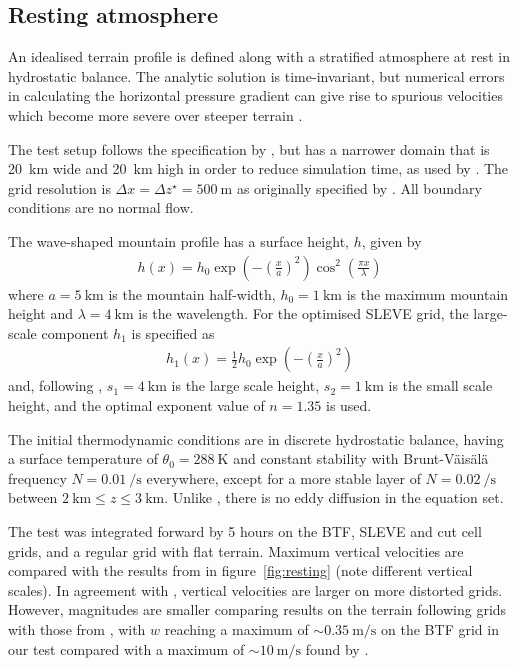 \documentclass[twocol]{ametsoc}
\begin{document}
\subsection{Resting atmosphere}
An idealised terrain profile is defined along with a stratified atmosphere at rest in hydrostatic balance.  The analytic solution is time-invariant, but numerical errors in calculating the horizontal pressure gradient can give rise to spurious velocities which become more severe over steeper terrain \citet{klemp2011}.

The test setup follows the specification by \cite{klemp2011}, but has a narrower domain that is \SI{20}{\kilo\meter} wide and \SI{20}{\kilo\meter} high in order to reduce simulation time, as used by \citet{weller-shahrokhi2014}.  The grid resolution is \(\Delta x = \Delta z^\star = \SI{500}{\meter}\) as originally specified by \citet{klemp2011}.  All boundary conditions are no normal flow.

The wave-shaped mountain profile has a surface height, $h$, given by
\begin{align}
	h(x) = h_0 \exp \left( - \left( \frac{x}{a} \right)^2 \right) \cos^2 \left( \frac{\pi x}{\lambda} \right) \label{eqn:resting:mountain}
\end{align}
where $a = \SI{5}{\kilo\meter}$ is the mountain half-width, $h_0 = \SI{1}{\kilo\meter}$ is the maximum mountain height and $\lambda = \SI{4}{\kilo\meter}$ is the wavelength.  For the optimised SLEVE grid, the large-scale component $h_1$ is specified as
\begin{align}
h_1(x) = \frac{1}{2} h_0 \exp \left( - \left( \frac{x}{a} \right)^2 \right)
\end{align}
and, following \cite{leuenberger2010}, $s_1 = \SI{4}{\kilo\meter}$ is the large scale height, $s_2 = \SI{1}{\kilo\meter}$ is the small scale height, and the optimal exponent value of $n = 1.35$ is used.

The initial thermodynamic conditions are in discrete hydrostatic balance, having a surface temperature of $\theta_0 = \SI{288}{\kelvin}$ and constant stability with Brunt-V\"ais\"al\"a frequency $N = \SI{0.01}{\per\second}$ everywhere, except for a more stable layer of $N = \SI{0.02}{\per\second}$ between $\SI{2}{\kilo\meter} \leq z \leq \SI{3}{\kilo\meter}$.  Unlike \citet{klemp2011}, there is no eddy diffusion in the equation set.

The test was integrated forward by 5 hours on the BTF, SLEVE and cut cell grids, and a regular grid with flat terrain.  Maximum vertical velocities are compared with the results from \citet{klemp2011} in figure~\ref{fig:resting} (note different vertical scales).  In agreement with \citet{klemp2011}, vertical velocities are larger on more distorted grids.  However, magnitudes are smaller comparing results on the terrain following grids with those from \citet{klemp2011}, with $w$ reaching a maximum of \(\sim \SI{0.35}{\meter\per\second}\) on the BTF grid in our test compared with a maximum of \(\sim \SI{10}{\meter\per\second}\) found by \citet{klemp2011}.
\end{document}
